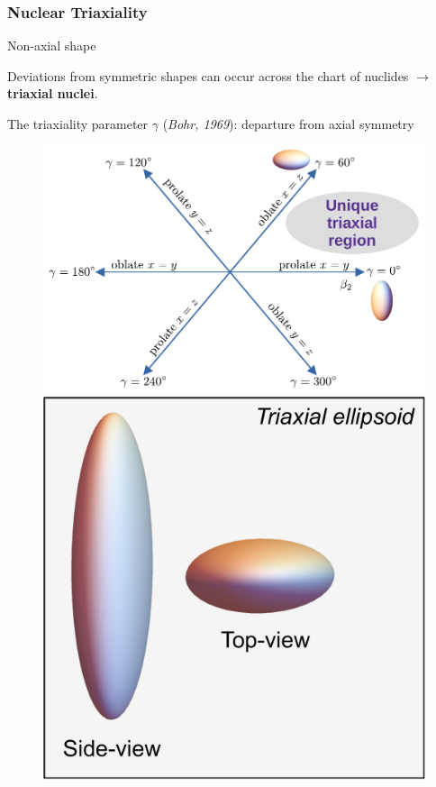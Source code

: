 \documentclass{beamer}
\begin{document}
\begin{frame}
  \frametitle{Nuclear Triaxiality}
  \begin{alertblock}{Non-axial shape}
    \par Deviations from symmetric shapes can occur across the chart of nuclides $\to$ \textbf{triaxial nuclei}.
    \par The triaxiality parameter $\gamma$ (\textit{Bohr, 1969}): departure from axial symmetry
  \end{alertblock}
  \begin{figure}
    \centering
    \includegraphics[scale=0.42]{Figs/nice_diagram.pdf}
    \includegraphics[scale=0.19]{Figs/triaxial-shape.pdf}
  \end{figure}
\end{frame}
\end{document}
